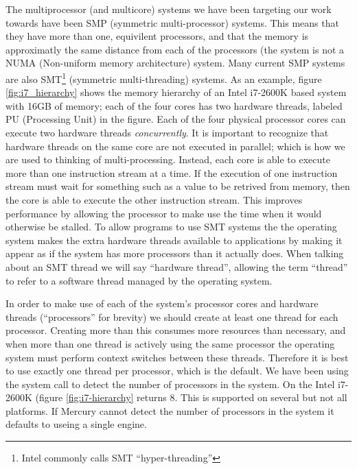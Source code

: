 The multiprocessor (and multicore) systems we have been targeting our work
towards have been SMP (symmetric multi-processor) systems.
This means that they have more than one, equivilent processors,
and that the memory is approximatly the same distance from each of the
processors (the system is not a NUMA (Non-uniform memory architecture)
system.
Many current SMP systems are also SMT\footnote{
    Intel commonly calls SMT ``hyper-threading''}
(symmetric multi-threading) systems.
As an example, figure \ref{fig:i7_hierarchy} shows the memory hierarchy of
an Intel i7-2600K based system with 16GB of memory;
each of the four cores has two hardware threads,
labeled PU (Processing Unit) in the figure.
Each of the four physical processor cores can execute two hardware threads
\emph{concurrently}.
It is important to recognize that hardware threads on the same core are not
executed in parallel;
which is how we are used to thinking of multi-processing.
Instead, each core is able to execute more than one instruction stream at a
time.
If the execution of one instruction stream must wait for something such as a
value to be retrived from memory,
then the core is able to execute the other instruction stream.
This improves performance by allowing the processor to make use the time
when it would otherwise be stalled.
To allow programs to use SMT systems the the operating system makes the
extra hardware threads available to applications by making it appear as if
the system has more processors than it actually does.
When talking about an SMT thread we will say ``hardware thread'',
allowing the term ``thread'' to refer to a software thread managed by the
operating system.

In order to make use of each of the system's processor cores and hardware
threads (``processors'' for brevity)
we should create at least one thread for each processor.
Creating more than this consumes more resources than necessary,
and when more than one thread is actively using the same processor the
operating system must perform context switches between these threads.
Therefore it is best to use exactly one thread per processor,
which is the default.
We have been using the
system call to detect the number of
processors in the system.
On the Intel i7-2600K (figure \ref{fig:i7-hierarchy}
returns 8.
This is supported on several but not all platforms.
If Mercury cannot detect the number of processors in the system it defaults 
to useing a single engine.

